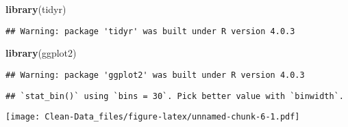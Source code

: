 \documentclass[
]{article}
\newenvironment{Shaded}{\begin{snugshade}}{\end{snugshade}}
\newcommand{\DataTypeTok}[1]{\textcolor[rgb]{0.13,0.29,0.53}{#1}}
\newcommand{\KeywordTok}[1]{\textcolor[rgb]{0.13,0.29,0.53}{\textbf{#1}}}
\newcommand{\NormalTok}[1]{#1}
\newcommand{\OperatorTok}[1]{\textcolor[rgb]{0.81,0.36,0.00}{\textbf{#1}}}
\newcommand{\StringTok}[1]{\textcolor[rgb]{0.31,0.60,0.02}{#1}}
\begin{document}
\begin{Shaded}
\begin{Highlighting}[]
\KeywordTok{library}\NormalTok{(tidyr)}
\end{Highlighting}
\end{Shaded}

\begin{verbatim}
## Warning: package 'tidyr' was built under R version 4.0.3
\end{verbatim}

\begin{Shaded}
\begin{Highlighting}[]
\KeywordTok{library}\NormalTok{(ggplot2)}
\end{Highlighting}
\end{Shaded}

\begin{verbatim}
## Warning: package 'ggplot2' was built under R version 4.0.3
\end{verbatim}

\begin{Shaded}
\end{Shaded}

\begin{verbatim}
## `stat_bin()` using `bins = 30`. Pick better value with `binwidth`.
\end{verbatim}

\texttt{[image: Clean-Data\_files/figure-latex/unnamed-chunk-6-1.pdf]}
\end{document}
